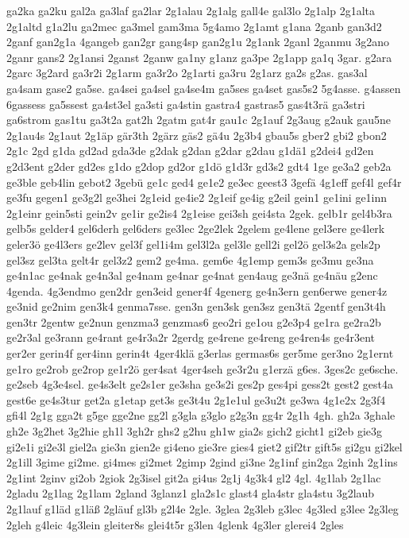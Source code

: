 {ga2ka
ga2ku
gal2a
ga3laf
ga2lar
2g1alau
2g1alg
gall4e
gal3lo
2g1alp
2g1alta
2g1altd
g1a2lu
ga2mec
ga3mel
gam3ma
5g4amo
2g1amt
g1ana
2ganb
gan3d2
2ganf
gan2g1a
4gangeb
gan2gr
gang4sp
gan2g1u
2g1ank
2ganl
2ganmu
3g2ano
2ganr
gans2
2g1ansi
2ganst
2ganw
ga1ny
g1anz
ga3pe
2g1app
ga1q
3gar.
g2ara
2garc
3g2ard
ga3r2i
2g1arm
ga3r2o
2g1arti
ga3ru
2g1arz
ga2s
g2as.
gas3al
ga4sam
gase2
ga5se.
ga4sei
ga4sel
ga4se4m
ga5ses
ga4set
gas5s2
5g4asse.
g4assen
6gassess
ga5ssest
ga4st3el
ga3sti
ga4stin
gastra4
gastras5
gas4t3rä
ga3stri
ga6strom
gas1tu
ga3t2a
gat2h
2gatm
gat4r
gau1c
2g1auf
2g3aug
g2auk
gau5ne
2g1au4s
2g1aut
2g1äp
gär3th
2gärz
gäs2
gä4u
2g3b4
gbau5s
gber2
gbi2
gbon2
2g1c
2gd
g1da
gd2ad
gda3de
g2dak
g2dan
g2dar
g2dau
g1dä1
g2dei4
gd2en
g2d3ent
g2der
gd2es
g1do
g2dop
gd2or
g1dö
g1d3r
gd3s2
gdt4
1ge
ge3a2
geb2a
ge3ble
geb4lin
gebot2
3gebü
ge1c
ged4
ge1e2
ge3ec
geest3
3gefä
4g1eff
gef4l
gef4r
ge3fu
gegen1
ge3g2l
ge3hei
2g1eid
ge4ie2
2g1eif
ge4ig
g2eil
gein1
ge1ini
ge1inn
2g1einr
gein5sti
gein2v
ge1ir
ge2is4
2g1eise
gei3sh
gei4sta
2gek.
gelb1r
gel4b3ra
gelb5s
gelder4
gel6derh
gel6ders
ge3lec
2ge2lek
2gelem
ge4lene
gel3ere
ge4lerk
geler3ö
ge4l3ers
ge2lev
gel3f
gel1i4m
gel3l2a
gel3le
gell2i
gel2ö
gel3s2a
gels2p
gel3sz
gel3ta
gelt4r
gel3z2
gem2
ge4ma.
gem6e
4g1emp
gem3s
ge3mu
ge3na
ge4n1ac
ge4nak
ge4n3al
ge4nam
ge4nar
ge4nat
gen4aug
ge3nä
ge4näu
g2enc
4genda.
4g3endmo
gen2dr
gen3eid
gener4f
4generg
ge4n3ern
gen6erwe
gener4z
ge3nid
ge2nim
gen3k4
genma7sse.
gen3n
gen3sk
gen3sz
gen3tä
2gentf
gen3t4h
gen3tr
2gentw
ge2nun
genzma3
genzmas6
geo2ri
ge1ou
g2e3p4
ge1ra
ge2ra2b
ge2r3al
ge3rann
ge4rant
ge4r3a2r
2gerdg
ge4rene
ge4reng
ge4ren4s
ge4r3ent
ger2er
gerin4f
ger4inn
gerin4t
4ger4klä
g3erlas
germas6s
ger5me
ger3no
2g1ernt
ge1ro
ge2rob
ge2rop
ge1r2ö
ger4sat
4ger4seh
ge3r2u
g1erzä
g6es.
3ges2c
ge6sche.
ge2seb
4g3e4sel.
ge4s3elt
ge2s1er
ge3sha
ge3s2i
ges2p
ges4pi
gess2t
gest2
gest4a
gest6e
ge4s3tur
get2a
g1etap
get3s
ge3t4u
2g1e1ul
ge3u2t
ge3wa
4g1e2x
2g3f4
gfi4l
2g1g
gga2t
g5ge
gge2ne
gg2l
g3gla
g3glo
g2g3n
gg4r
2g1h
4gh.
gh2a
3ghale
gh2e
3g2het
3g2hie
gh1l
3gh2r
ghs2
g2hu
gh1w
gia2s
gich2
gicht1
gi2eb
gie3g
gi2e1i
gi2e3l
giel2a
gie3n
gien2e
gi4eno
gie3re
gies4
giet2
gif2tr
gift5s
gi2gu
gi2kel
2g1ill
3gime
gi2me.
gi4mes
gi2met
2gimp
2gind
gi3ne
2g1inf
gin2ga
2ginh
2g1ins
2g1int
2ginv
gi2ob
2giok
2g3isel
git2a
gi4us
2g1j
4g3k4
gl2
4gl.
4g1lab
2g1lac
2gladu
2g1lag
2g1lam
2gland
3glanz1
gla2s1c
glast4
gla4str
gla4stu
3g2laub
2g1lauf
g1läd
g1läß
2gläuf
gl3b
g2l4e
2gle.
3glea
2g3leb
g3lec
4g3led
g3lee
2g3leg
2gleh
g4leic
4g3lein
gleiter8s
glei4t5r
g3len
4glenk
4g3ler
glerei4
2gles
}
